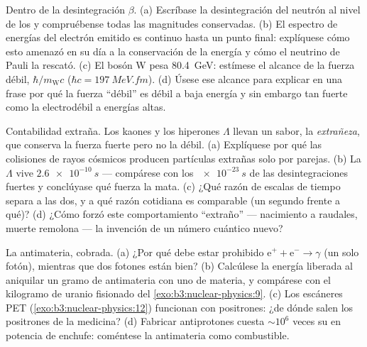 \begin{exercise}[$\star\star$]\label{exo:b3:particle-physics:6}
Dentro de la desintegración $\beta$. (a) Escríbase la desintegración del neutrón al nivel
de los  y compruébense todas las magnitudes conservadas. (b) El espectro de
energías del electrón emitido es continuo hasta un punto final:
explíquese cómo esto amenazó en su día a la conservación de la energía y cómo
el neutrino de Pauli la rescató. (c) El bosón W pesa
\qty{80.4}{GeV}: estímese el alcance de la fuerza débil,
$\hbar/m_{\text{W}}c$ ($\hbar c = \qty{197}{MeV.fm}$). (d) Úsese
ese alcance para explicar en una frase por qué la fuerza ``débil'' es
débil a baja energía y sin embargo tan fuerte como la electrodébil a energías altas.
\end{exercise}

\begin{exercise}[$\star\star$]\label{exo:b3:particle-physics:7}
Contabilidad extraña. Los kaones y los hiperones $\Lambda$ llevan un
sabor, la \emph{extrañeza}, que conserva la fuerza fuerte pero
no la débil. (a) Explíquese por qué las colisiones de rayos cósmicos producen
partículas extrañas solo por parejas. (b) La $\Lambda$ vive
$\qty{2.6e-10}{s}$ --- compárese con los $\qty{e-23}{s}$ de las
desintegraciones fuertes y conclúyase qué fuerza la mata. (c) ¿Qué razón
de escalas de tiempo separa a las dos, y a qué razón cotidiana es
comparable (un segundo frente a qué)? (d) ¿Cómo forzó este comportamiento
``extraño'' --- nacimiento a raudales, muerte remolona ---
la invención de un número cuántico nuevo?
\end{exercise}

\begin{exercise}[$\star\star$]\label{exo:b3:particle-physics:8}
La antimateria, cobrada. (a) ¿Por qué debe estar prohibido
$\text{e}^+ + \text{e}^- \to \gamma$ (un solo fotón),
mientras que dos fotones están bien? (b) Calcúlese la energía liberada al
aniquilar un gramo de antimateria con uno de materia, y
compárese con el kilogramo de uranio fisionado del
\cref{exo:b3:nuclear-physics:9}. (c) Los escáneres PET
(\cref{exo:b3:nuclear-physics:12}) funcionan con positrones: ¿de dónde
salen los positrones de la medicina? (d) Fabricar antiprotones cuesta
$\sim10^{6}$ veces su  en potencia de enchufe: coméntese
la antimateria como combustible.
\end{exercise}

